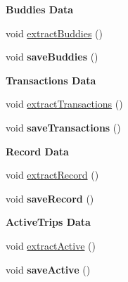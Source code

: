 \begin{Indent}\textbf{ Buddies Data}\par
\begin{DoxyCompactItemize}
\item 
void \hyperlink{group___agency_ga93c45528d2114a557a1e0b23498e178a}{extract\+Buddies} ()
\item 
void {\bfseries save\+Buddies} ()
\end{DoxyCompactItemize}
\end{Indent}
\begin{Indent}\textbf{ Transactions Data}\par
\begin{DoxyCompactItemize}
\item 
void \hyperlink{group___agency_gadfda62c1a33db5f797098d0391e6ee87}{extract\+Transactions} ()
\item 
void {\bfseries save\+Transactions} ()
\end{DoxyCompactItemize}
\end{Indent}
\begin{Indent}\textbf{ Record Data}\par
\begin{DoxyCompactItemize}
\item 
void \hyperlink{group___agency_ga8cafe0f0410e881f1a0d7a1bdd502058}{extract\+Record} ()
\item 
void {\bfseries save\+Record} ()
\end{DoxyCompactItemize}
\end{Indent}
\begin{Indent}\textbf{ Active\+Trips Data}\par
\begin{DoxyCompactItemize}
\item 
void \hyperlink{group___agency_ga82ad0980163a0e874b1ca165b7b9c91c}{extract\+Active} ()
\item 
void {\bfseries save\+Active} ()
\end{DoxyCompactItemize}
\end{Indent}
